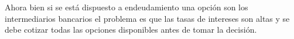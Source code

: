 \begin{enumerate}[(a)]
            Ahora bien si se está dispuesto a endeudamiento una opción son los intermediarios bancarios el problema es que las tasas de intereses 
            son altas y se debe cotizar todas las opciones disponibles antes de tomar la decisión.

            

\end{enumerate}
